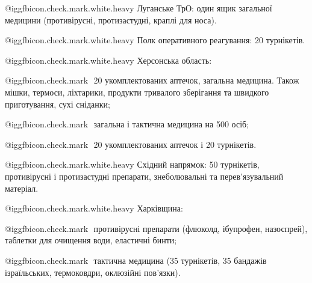  @igg{fbicon.check.mark.white.heavy} ️Луганське ТрО: один ящик загальної медицини (противірусні, протизастудні,
краплі для носа).

 @igg{fbicon.check.mark.white.heavy} ️Полк оперативного реагування: 20 турнікетів. 

 @igg{fbicon.check.mark.white.heavy} ️Херсонська область: 

 @igg{fbicon.check.mark} ️ 20 укомплектованих аптечок, загальна медицина. Також мішки, термоси,
ліхтарики, продукти тривалого зберігання та швидкого приготування, сухі
сніданки;

 @igg{fbicon.check.mark} ️ загальна і тактична медицина на 500 осіб;

 @igg{fbicon.check.mark} ️ 20 укомплектованих аптечок і 20 турнікетів.

 @igg{fbicon.check.mark.white.heavy} ️Східний напрямок: 50 турнікетів, противірусні і протизастудні препарати,
знеболювальні та перев'язувальний матеріал. 

 @igg{fbicon.check.mark.white.heavy} ️Харківщина:

 @igg{fbicon.check.mark} ️ противірусні препарати (флюколд, ібупрофен, назоспрей), таблетки для очищення
води, еластичні бинти;

 @igg{fbicon.check.mark} ️ тактична медицина (35 турнікетів, 35 бандажів ізраїльських, термоковдри,
оклюзійні пов'язки).
